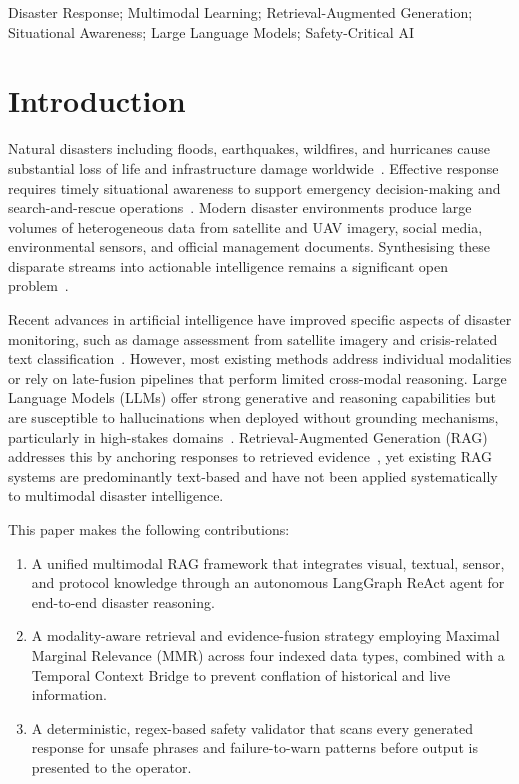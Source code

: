 \documentclass[conference]{IEEEtran}
\begin{document}
\begin{IEEEkeywords}
Disaster Response; Multimodal Learning; Retrieval-Augmented Generation;
Situational Awareness; Large Language Models; Safety-Critical AI
\end{IEEEkeywords}

\section{Introduction}

Natural disasters including floods, earthquakes, wildfires, and hurricanes
cause substantial loss of life and infrastructure damage worldwide~\cite{b1}.
Effective response requires timely situational awareness to support emergency
decision-making and search-and-rescue operations~\cite{b2}. Modern disaster
environments produce large volumes of heterogeneous data from satellite and UAV
imagery, social media, environmental sensors, and official management
documents. Synthesising these disparate streams into actionable intelligence
remains a significant open problem~\cite{b3}.

Recent advances in artificial intelligence have improved specific aspects of
disaster monitoring, such as damage assessment from satellite imagery and
crisis-related text classification~\cite{b4}. However, most existing methods
address individual modalities or rely on late-fusion pipelines that perform
limited cross-modal reasoning. Large Language Models (LLMs) offer strong
generative and reasoning capabilities but are susceptible to hallucinations
when deployed without grounding mechanisms, particularly in high-stakes
domains~\cite{b5}. Retrieval-Augmented Generation (RAG) addresses this by
anchoring responses to retrieved evidence~\cite{b6}, yet existing RAG systems
are predominantly text-based and have not been applied systematically to
multimodal disaster intelligence.

This paper makes the following contributions:
\begin{enumerate}
  \item A unified multimodal RAG framework that integrates visual,
        textual, sensor, and protocol knowledge through an autonomous
        LangGraph ReAct agent for end-to-end disaster reasoning.
  \item A modality-aware retrieval and evidence-fusion strategy employing
        Maximal Marginal Relevance (MMR) across four indexed data types,
        combined with a Temporal Context Bridge to prevent conflation of
        historical and live information.
  \item A deterministic, regex-based safety validator that scans every
        generated response for unsafe phrases and failure-to-warn patterns
        before output is presented to the operator.
\end{enumerate}
\end{document}
